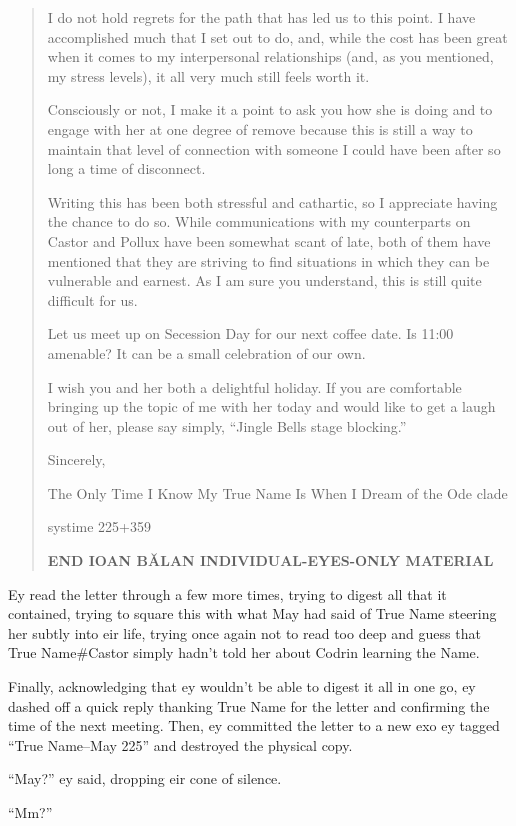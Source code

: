 \begin{quote}
I do not hold regrets for the path that has led us to this point. I have accomplished much that I set out to do, and, while the cost has been great when it comes to my interpersonal relationships (and, as you mentioned, my stress levels), it all very much still feels worth it.

Consciously or not, I make it a point to ask you how she is doing and to engage with her at one degree of remove because this is still a way to maintain that level of connection with someone I could have been after so long a time of disconnect.

Writing this has been both stressful and cathartic, so I appreciate having the chance to do so. While communications with my counterparts on Castor and Pollux have been somewhat scant of late, both of them have mentioned that they are striving to find situations in which they can be vulnerable and earnest. As I am sure you understand, this is still quite difficult for us.

Let us meet up on Secession Day for our next coffee date. Is 11:00 amenable? It can be a small celebration of our own.

I wish you and her both a delightful holiday. If you are comfortable bringing up the topic of me with her today and would like to get a laugh out of her, please say simply, ``Jingle Bells stage blocking.''

Sincerely,

The Only Time I Know My True Name Is When I Dream of the Ode clade

systime 225+359

\textbf{END IOAN BĂLAN INDIVIDUAL-EYES-ONLY MATERIAL}
\end{quote}

Ey read the letter through a few more times, trying to digest all that it contained, trying to square this with what May had said of True Name steering her subtly into eir life, trying once again not to read too deep and guess that True Name\#Castor simply hadn't told her about Codrin learning the Name.

Finally, acknowledging that ey wouldn't be able to digest it all in one go, ey dashed off a quick reply thanking True Name for the letter and confirming the time of the next meeting. Then, ey committed the letter to a new exo ey tagged ``True Name--May 225'' and destroyed the physical copy.

``May?'' ey said, dropping eir cone of silence.

``Mm?''

